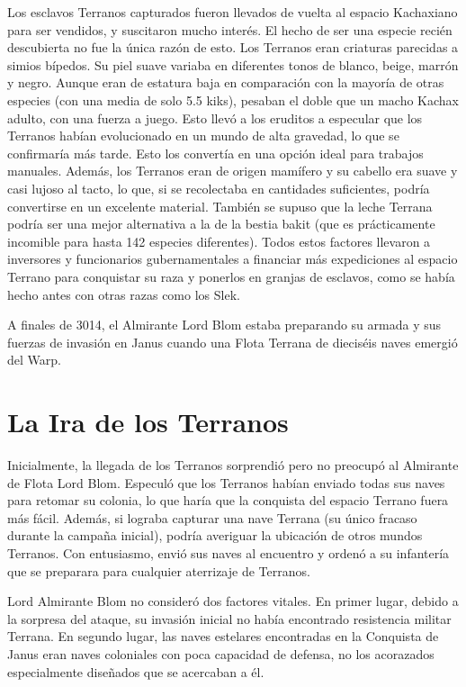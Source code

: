 \documentclass[spanish,12pt,a4paper,oneside,titlepage, twocolumn]{article}
\begin{document}
    Los esclavos Terranos capturados fueron llevados de vuelta al espacio Kachaxiano para ser vendidos, y suscitaron mucho interés. El hecho de ser una especie recién descubierta no fue la única razón de esto. Los Terranos eran criaturas parecidas a simios bípedos. Su piel suave variaba en diferentes tonos de blanco, beige, marrón y negro. Aunque eran de estatura baja en comparación con la mayoría de otras especies (con una media de solo 5.5 kiks), pesaban el doble que un macho Kachax adulto, con una fuerza a juego. Esto llevó a los eruditos a especular que los Terranos habían evolucionado en un mundo de alta gravedad, lo que se confirmaría más tarde. Esto los convertía en una opción ideal para trabajos manuales. Además, los Terranos eran de origen mamífero y su cabello era suave y casi lujoso al tacto, lo que, si se recolectaba en cantidades suficientes, podría convertirse en un excelente material. También se supuso que la leche Terrana podría ser una mejor alternativa a la de la bestia bakit (que es prácticamente incomible para hasta 142 especies diferentes). Todos estos factores llevaron a inversores y funcionarios gubernamentales a financiar más expediciones al espacio Terrano para conquistar su raza y ponerlos en granjas de esclavos, como se había hecho antes con otras razas como los Slek.

    A finales de 3014, el Almirante Lord Blom estaba preparando su armada y sus fuerzas de invasión en Janus cuando una Flota Terrana de dieciséis naves emergió del Warp.

    \section*{\centering La Ira de los Terranos}

    Inicialmente, la llegada de los Terranos sorprendió pero no preocupó al Almirante de Flota Lord Blom. Especuló que los Terranos habían enviado todas sus naves para retomar su colonia, lo que haría que la conquista del espacio Terrano fuera más fácil. Además, si lograba capturar una nave Terrana (su único fracaso durante la campaña inicial), podría averiguar la ubicación de otros mundos Terranos. Con entusiasmo, envió sus naves al encuentro y ordenó a su infantería que se preparara para cualquier aterrizaje de Terranos.

    Lord Almirante Blom no consideró dos factores vitales. En primer lugar, debido a la sorpresa del ataque, su invasión inicial no había encontrado resistencia militar Terrana. En segundo lugar, las naves estelares encontradas en la Conquista de Janus eran naves coloniales con poca capacidad de defensa, no los acorazados especialmente diseñados que se acercaban a él.
\end{document}
